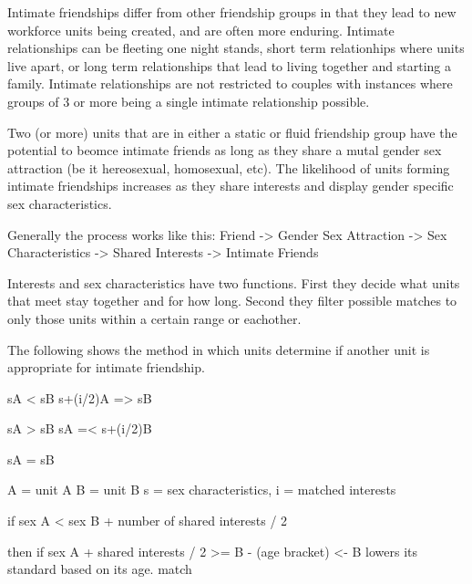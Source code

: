 

Intimate friendships differ from other friendship groups in that they lead to new workforce units being created, and are often more enduring. Intimate relationships can be fleeting one night stands, short term relationhips where units live apart, or long term relationships that lead to living together and starting a family. Intimate relationships are not restricted to couples with instances where groups of 3 or more being a single intimate relationship possible.   

Two (or more) units that are in either a static or fluid friendship group have the potential to beomce intimate friends as long as they share a mutal gender sex attraction (be it hereosexual, homosexual, etc). The likelihood of units forming intimate friendships increases as they share interests and display gender specific sex characteristics. 

Generally the process works like this: Friend -> Gender Sex Attraction -> Sex Characteristics -> Shared Interests -> Intimate Friends

Interests and sex characteristics have two functions. First they decide what units that meet stay together and for how long. Second they filter possible matches to only those units within a certain range or eachother.

The following shows the method in which units determine if another unit is appropriate for intimate friendship.

sA        <       sB
s+(i/2)A =>       sB

sA        >       sB
sA       =< s+(i/2)B

sA       =        sB

A = unit A
B = unit B
s = sex characteristics,
i = matched interests


if sex A < sex B 
+ number of shared interests / 2 
 
 then
  if sex A + shared interests / 2 >= B - (age bracket) <- B lowers its standard based on its age.
  match

